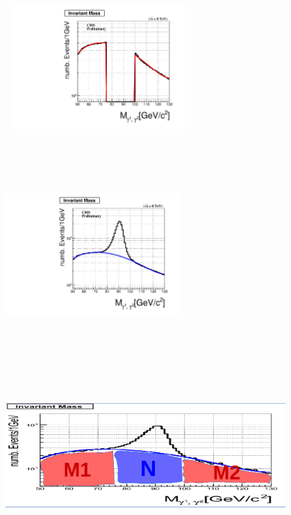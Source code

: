 \begin{center}
\centering
\mbox{
\includegraphics[height=7cm, width=0.5\textwidth]{THESISPLOTS/Uncleaned-di-Photon-ZMass-Fit-DoubleElectron-Run2012A.pdf}
\includegraphics[height=7cm, width=0.5\textwidth]{THESISPLOTS/Background_In_ZMass-From-Di-Photon.pdf}}
\mbox{
\includegraphics[height=8cm, width=0.8\textwidth]{THESISPLOTS/ZBackground_SF.png}
}
\label{fig:collZ}
\end{center}

